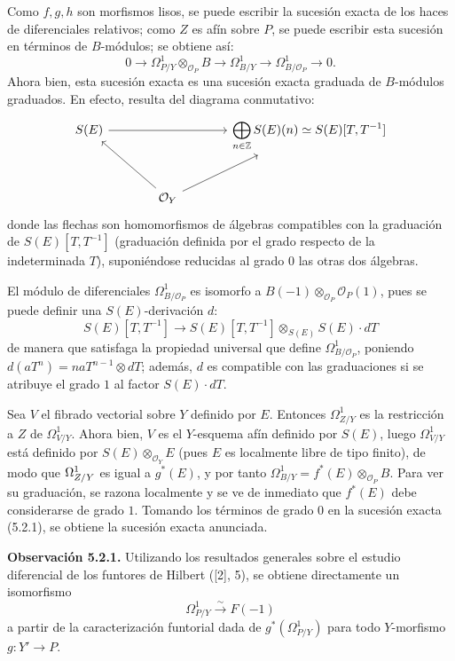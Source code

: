 Como \(f,g,h\) son morfismos lisos, se puede escribir la sucesión exacta de
los haces de diferenciales relativos; como \(Z\) es afín sobre \(P\), se puede
escribir esta sucesión en términos de \(B\)-módulos; se obtiene así:
\begin{equation}\tag{5.2.1}
0\longrightarrow
 \Omega^1_{P/Y}\otimes_{\mathcal O_P}B
\longrightarrow
 \Omega^1_{B/Y}
\longrightarrow
 \Omega^1_{B/\mathcal O_P}
\longrightarrow0 .
\end{equation}
Ahora bien, esta sucesión exacta es una sucesión exacta graduada de
\(B\)-módulos graduados. En efecto, resulta del diagrama conmutativo:
\[
\begin{tikzcd}[column sep=large,row sep=large]
S(E) \arrow[rr] && \displaystyle\bigoplus_{n\in\mathbb Z}S(E)(n)\simeq S(E)[T,T^{-1}]\\
& \sisi{\mathcal O_X}{\mathcal O_Y} \arrow[ul] \arrow[ur] &
\end{tikzcd}
\]
donde las flechas son homomorfismos de álgebras compatibles con la graduación
de \(S(E)[T,T^{-1}]\) (graduación definida por el grado respecto de la
indeterminada \(T\)), suponiéndose reducidas al grado \(0\) las otras dos
álgebras.

El módulo de diferenciales \(\Omega^1_{B/\mathcal O_P}\) es isomorfo a
\(B(-1)\otimes_{\mathcal O_P}\mathcal O_P(1)\), pues se puede definir una
\(S(E)\)-derivación \(d\):
\[
S(E)[T,T^{-1}]
\longrightarrow
S(E)[T,T^{-1}]\otimes_{S(E)}S(E)\cdot dT
\]
de manera que satisfaga la propiedad universal que define
\(\Omega^1_{B/\mathcal O_P}\), poniendo
\(d(aT^n)=naT^{n-1}\otimes dT\); además, \(d\) es compatible con las
graduaciones si se atribuye el grado \(1\) al factor \(S(E)\cdot dT\).

Sea \(V\) el fibrado vectorial sobre \(Y\) definido por \(E\). Entonces
\(\Omega^1_{Z/Y}\) es la restricción a \(Z\) de \(\Omega^1_{V/Y}\). Ahora
bien, \(V\) es el \(Y\)-esquema afín definido por \(S(E)\), luego
\(\Omega^1_{V/Y}\) está definido por
\(S(E)\otimes_{\mathcal O_Y}E\) (pues \(E\) es localmente libre de tipo
finito), de modo que \(\sisi{\Omega^1_{V/Y}}{\Omega^1_{Z/Y}}\) es igual a \(g^*(E)\), y por tanto
\(\Omega^1_{B/Y}=f^*(E)\otimes_{\mathcal O_P}B\). Para ver su graduación, se
razona localmente y se ve de inmediato que \(f^*(E)\) debe considerarse de
grado \(1\). Tomando los términos de grado \(0\) en la sucesión exacta
(5.2.1), se obtiene la sucesión exacta anunciada.

\textbf{Observación 5.2.1.} Utilizando los resultados generales sobre el
estudio diferencial de los funtores de Hilbert ([2], 5), se obtiene
directamente un isomorfismo
\[
\Omega^1_{P/Y}\xrightarrow{\sim}F(-1)
\]
a partir de la caracterización funtorial dada de
\(g^*(\Omega^1_{P/Y})\) para todo \(Y\)-morfismo \(g:Y'\to P\).

